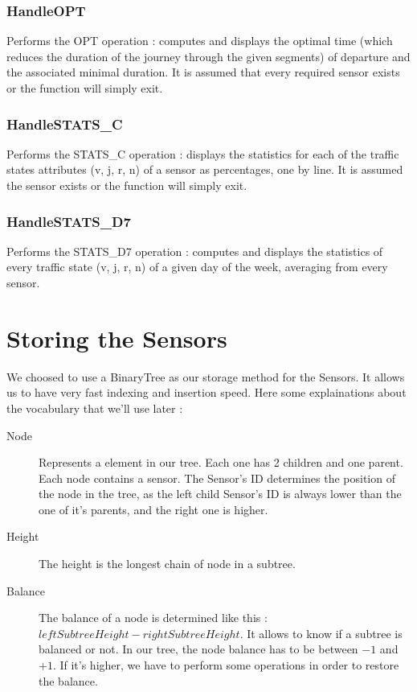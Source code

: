 \documentclass[10pt]{article}
\begin{document}
\subsubsection*{HandleOPT}
Performs the OPT operation : computes and displays the optimal time (which reduces the duration of the journey through the given segments) of departure and the associated minimal duration. It is assumed that every required sensor exists or the function will simply exit.

\subsubsection*{HandleSTATS\_C}
Performs the STATS\_C operation : displays the statistics for each of the traffic states attributes (v, j, r, n) of a sensor as percentages, one by line. It is assumed the sensor exists or the function will simply exit.

\subsubsection*{HandleSTATS\_D7}
Performs the STATS\_D7 operation : computes and displays the statistics of every traffic state (v, j, r, n) of a given day of the week, averaging from every sensor.

\section{Storing the Sensors}
We choosed to use a BinaryTree as our storage method for the Sensors. It allows us to have very fast indexing and insertion speed.
Here some explainations about the vocabulary that we'll use later :
\begin{description}
	\item[Node] Represents a element in our tree. Each one has 2 children and one parent. Each node contains a sensor. The Sensor's ID determines the position of the node in the tree, as the left child Sensor's ID is always lower than the one of it's parents, and the right one is higher.
	\item[Height] The height is the longest chain of node in a subtree.
	\item[Balance] The balance of a node is determined like this : $ leftSubtreeHeight - rightSubtreeHeight$. It allows to know if a subtree is balanced or not. In our tree, the node balance has to be between $-1$ and $+1$. If it's higher, we have to perform some operations in order to restore the balance.
\end{description}
\end{document}
